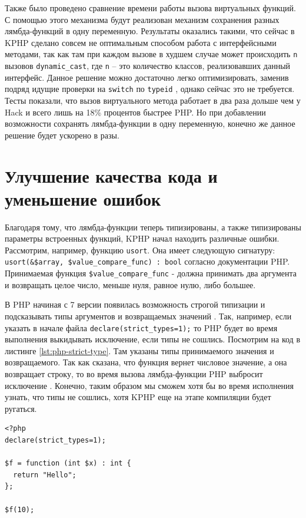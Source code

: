 Также было проведено сравнение времени работы вызова виртуальных функций.
С помощью этого механизма будут реализован механизм сохранения разных лямбда-функций в одну переменную.
Результаты оказались такими, что сейчас в KPHP сделано совсем не оптимальным способом работа с интерфейсными методами, так как там при каждом вызове в худшем случае может происходить \verb|n| вызовов \verb|dynamic_cast|, где \verb|n| -- это количество классов, реализовавших данный интерфейс.
Данное решение можно достаточно легко оптимизировать, заменив подряд идущие проверки на \verb|switch| по \verb|typeid| \cite{fast-dynamic-cast}, однако сейчас это не требуется.
Тесты показали, что вызов виртуального метода работает в два раза дольше чем у Hack и всего лишь на 18\% процентов быстрее PHP.
Но при добавлении возможности сохранять лямбда-функции в одну переменную, конечно же данное решение будет ускорено в разы.

\section{Улучшение качества кода и уменьшение ошибок}
Благодаря тому, что лямбда-функции теперь типизированы, а также типизированы параметры встроенных функций, KPHP начал находить различные ошибки.
Рассмотрим, например, функцию \verb|usort|.
Она имеет следующую сигнатуру: \verb|usort(&$array, $value_compare_func) : bool| согласно документации PHP.
Принимаемая функция \verb|$value_compare_func| - должна принимать два аргумента и возвращать целое число, меньше нуля, равное нулю, либо большее.

В PHP начиная с 7 версии появилась возможность строгой типизации и подсказывать типы аргументов и возвращаемых значений \cite{php-7-strict-types}.
Так, например, если указать в начале файла \verb|declare(strict_types=1);| то PHP будет во время выполнения выкидывать исключение, если типы не сошлись.
Посмотрим на код в листинге \ref{lst:php-strict-type}.
Там указаны типы принимаемого значения и возвращаемого.
Так как сказана, что функция вернет числовое значение, а она возвращает строку, то во время вызова лямбда-функции PHP выбросит исключение \cite{php-7-pitfalls}.
Конечно, таким образом мы сможем хотя бы во время исполнения узнать, что типы не сошлись, хотя KPHP еще на этапе компиляции будет ругаться.
\begin{lstlisting}[caption={Пример типизации в PHP7}, label={lst:php-strict-type}]
<?php
declare(strict_types=1);

$f = function (int $x) : int {
  return "Hello";
};

$f(10);
\end{lstlisting}


